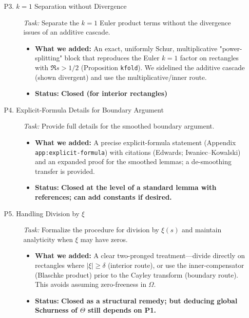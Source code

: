 \documentclass[11pt, a4paper]{article}
\newcommand{\status}[2]{\textcolor{#1}{\textbf{#2}}}
\begin{document}
\begin{description}
    \item[P3. $k=1$ Separation without Divergence]
    \textit{Task:} Separate the $k=1$ Euler product terms without the divergence issues of an additive cascade.
    \begin{itemize}[leftmargin=*, label={--}]
        \item \textbf{What we added:} An exact, uniformly Schur, multiplicative "power-splitting" block that reproduces the Euler $k=1$ factor on rectangles with $\Re s > 1/2$ (Proposition \texttt{kfold}). We sidelined the additive cascade (shown divergent) and use the multiplicative/inner route.
        \item \textbf{Status:} \status{green!60!black}{Closed (for interior rectangles)}
    \end{itemize}

    \item[P4. Explicit-Formula Details for Boundary Argument]
    \textit{Task:} Provide full details for the smoothed boundary argument.
    \begin{itemize}[leftmargin=*, label={--}]
        \item \textbf{What we added:} A precise explicit-formula statement (Appendix \texttt{app:explicit-formula}) with citations (Edwards; Iwaniec--Kowalski) and an expanded proof for the smoothed lemmas; a de-smoothing transfer is provided.
        \item \textbf{Status:} \status{green!60!black}{Closed at the level of a standard lemma with references; can add constants if desired.}
    \end{itemize}

    \item[P5. Handling Division by $\xi$]
    \textit{Task:} Formalize the procedure for division by $\xi(s)$ and maintain analyticity when $\xi$ may have zeros.
    \begin{itemize}[leftmargin=*, label={--}]
        \item \textbf{What we added:} A clear two-pronged treatment—divide directly on rectangles where $|\xi| \ge \delta$ (interior route), or use the inner-compensator (Blaschke product) prior to the Cayley transform (boundary route). This avoids assuming zero-freeness in $\Omega$.
        \item \textbf{Status:} \status{green!60!black}{Closed as a structural remedy; but deducing global Schurness of $\Theta$ still depends on P1.}
    \end{itemize}


\end{description}
\end{document}
